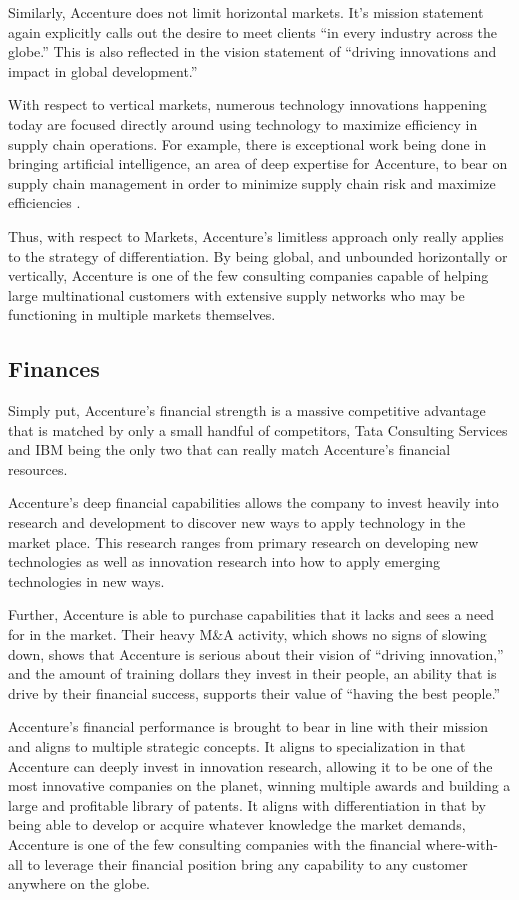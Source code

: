 Similarly, Accenture does not limit horizontal markets. It's mission statement again explicitly calls out the desire to meet clients ``in every industry across the globe.'' This is also reflected in the vision statement of ``driving innovations and impact in global development.''

With respect to vertical markets, numerous technology innovations happening today are focused directly around using technology to maximize efficiency in supply chain operations. For example, there is exceptional work being done in bringing artificial intelligence, an area of deep expertise for Accenture, to bear on supply chain management in order to minimize supply chain risk and maximize efficiencies \parencite{baryannisSupplyChainRisk2019}.

Thus, with respect to Markets, Accenture's limitless approach only really applies to the strategy of differentiation. By being global, and unbounded horizontally or vertically, Accenture is one of the few consulting companies capable of helping large multinational customers with extensive supply networks who may be functioning in multiple markets themselves.

\subsection{Finances}

Simply put, Accenture's financial strength is a massive competitive advantage that is matched by only a small handful of competitors, Tata Consulting Services and IBM being the only two that can really match Accenture's financial resources.

Accenture's deep financial capabilities allows the company to invest heavily into research and development to discover new ways to apply technology in the market place. This research ranges from primary research on developing new technologies as well as innovation research into how to apply emerging technologies in new ways.

Further, Accenture is able to purchase capabilities that it lacks and sees a need for in the market. Their heavy M\&A activity, which shows no signs of slowing down, shows that Accenture is serious about their vision of ``driving innovation,'' and the amount of training dollars they invest in their people, an ability that is drive by their financial success, supports their value of ``having the best people.''

Accenture's financial performance is brought to bear in line with their mission and aligns to multiple strategic concepts. It aligns to specialization in that Accenture can deeply invest in innovation research, allowing it to be one of the most innovative companies on the planet, winning multiple awards and building a large and profitable library of patents. It aligns with differentiation in that by being able to develop or acquire whatever knowledge the market demands, Accenture is one of the few consulting companies with the financial where-with-all to leverage their financial position bring any capability to any customer anywhere on the globe.

